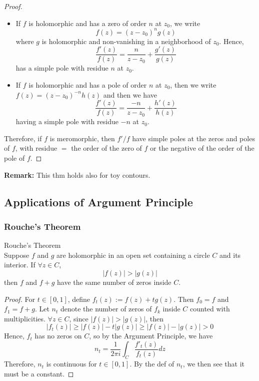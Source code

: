 \begin{proof}
    \begin{itemize}
        \item If $f$ is holomorphic and has a zero of order $n$ at $z_0$, we write
        \[
        f(z)= (z-z_0)^n g(z)
        \]
        where $g$ is holomorphic and non-vanishing in a neighborhood of $z_0$. Hence, 
        \[
        \frac{f'(z)}{f(z)}= \frac{n}{z-z_0} +\frac{g'(z)}{g(z)}
        \]
        has a simple pole with residue $n$ at $z_0$.

        \item If $f$ is holomorphic and has a pole of order $n$ at $z_0$, then we write $f(z)= (z-z_0)^{-n} h(z)$ and then we have
        \[
        \frac{f'(z)}{f(z)} =\frac{-n}{z-z_0} +\frac{h'(z)}{h(z)}
        \]
        having a simple pole with residue $-n$ at $z_0$.
    \end{itemize}
    Therefore, if $f$ is meromorphic, then $f'/f$ have simple poles at the zeros and poles of $f$, with residue $=$ the order of the zero of $f$ or the negative of the order of the pole of $f$.
\end{proof}

\noindent\textbf{Remark:} This thm holds also for toy contours.

\subsection{Applications of Argument Principle}

\subsubsection{Rouche's Theorem}

\begin{theorem}{Rouche's Theorem}\\
Suppose $f$ and $g$ are holomorphic in an open set containing a circle $C$ and its interior. If $\forall z\in C$,
\[
|f(z)| >|g(z)|
\]
then $f$ and $f+g$ have the same number of zeros inside $C$.
\end{theorem}

\begin{proof}
    For $t\in [0,1]$, define $f_t(z) := f(z) +tg(z)$. Then $f_0=f$ and $f_1=f+g$. Let $n_t$ denote the number of zeros of $f_k$ inside $C$ counted with multiplicities. $\forall z\in C$, since $|f(z)| >|g(z)|$, then
    \[
    |f_t(z)|\geq |f(z)|- t |g(z)| \geq |f(z)|- |g(z)|>0
    \]
    Hence, $f_t$ has no zeros on $C$, so by the Argument Principle, we have
    \[
    n_t= \frac{1}{2\pi i} \int_C \frac{f'_t(z)}{f_t(z)}dz
    \]
    Therefore, $n_t$ is continuous for $t\in [0,1]$. By the def of $n_t$, we then see that it must be a constant.
\end{proof}

